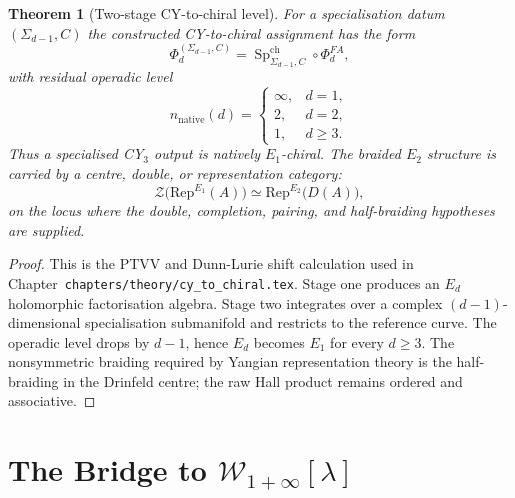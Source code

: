 \documentclass[11pt]{article}
\newtheorem{theorem}{Theorem}[section]
\providecommand{\Wilpha}{\mathcal{W}_{1+\infty}}
\providecommand{\Eone}{E_1}
\providecommand{\Etwo}{E_2}
\providecommand{\Rep}{\mathrm{Rep}}
\begin{document}
\begin{theorem}[Two-stage CY-to-chiral level]
\label{thm:native-level}
For a specialisation datum $(\Sigma_{d-1},C)$ the constructed
CY-to-chiral assignment has the form
\[
\Phi_d^{(\Sigma_{d-1},C)}
=\operatorname{Sp}^{\mathrm{ch}}_{\Sigma_{d-1},C}\circ\Phi_d^{FA},
\]
with residual operadic level
\[
n_{\mathrm{native}}(d)=
\begin{cases}
\infty,& d=1,\\
2,& d=2,\\
1,& d\geq 3.
\end{cases}
\]
Thus a specialised CY$_3$ output is natively $\Eone$-chiral. The braided
$\Etwo$ structure is carried by a centre, double, or representation
category:
\[
\mathcal{Z}\bigl(\Rep^{\Eone}(A)\bigr)
\simeq
\Rep^{\Etwo}\bigl(D(A)\bigr),
\]
on the locus where the double, completion, pairing, and half-braiding
hypotheses are supplied.
\end{theorem}

\begin{proof}
This is the PTVV and Dunn-Lurie shift calculation used in
Chapter~\texttt{chapters/theory/cy\_to\_chiral.tex}. Stage one produces
an $E_d$ holomorphic factorisation algebra. Stage two integrates over a
complex $(d-1)$-dimensional specialisation submanifold and restricts to the
reference curve. The operadic level drops by $d-1$, hence $E_d$ becomes
$E_1$ for every $d\geq 3$. The nonsymmetric braiding required by
Yangian representation theory is the half-braiding in the Drinfeld
centre; the raw Hall product remains ordered and associative.
\end{proof}

\section{The Bridge to $\Wilpha[\lambda]$}
\end{document}
